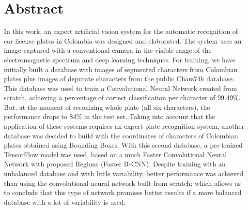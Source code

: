 \chapter*{Abstract}
\setcounter{page}{3}
In this work, an expert artificial vision system for the automatic recognition of car license plates in Colombia was designed and elaborated. The system uses an image captured with a conventional camera in the visible range of the electromagnetic spectrum and deep learning techniques.
 For training, we have initially built a database with images of segmented characters from Colombian plates plus images of depurate characters from the public Chars74k database. This database was used to train a Convolutional Neural Network created from scratch, achieving a percentage of correct classification per character of 99.49\%. But, at the moment of reconizing whole plate (all six characters), the performance drops to 84\% in the test set.
Taking into account that the application of these systems requires an expert plate recognition system, another database was decided to build with the coordinates of characters of Colombian plates obtained using Bounding Boxes. With this second database, a pre-trained TensorFlow model was used, based on a much Faster Convolutional Neural Network with proposed Regions (Faster R-CNN). Despite training with an unbalanced database and with little variability, better performance was achieved than using the convolutional neural network built from scratch; which allows us to conclude that this type of network promises better results if a more balanced database with a lot of variability is used.

\newpage

\thispagestyle{empty}
\tableofcontents
\clearpage
{}
\listoffigures
\clearpage
{}
\listoftables